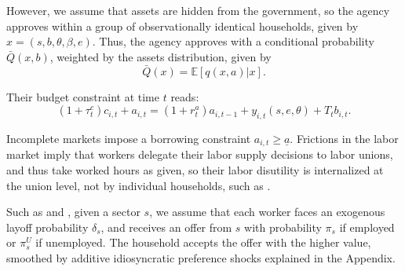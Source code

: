 \documentclass[12pt]{article}
\newcommand{\E}{\mathbb{E}}
\begin{document}
However, we assume that assets are hidden from the government, so the agency approves
within a group of observationally identical households, given by
$x = (s,b,\theta,\beta, e)$. Thus, the agency approves with a conditional probability
$\bar Q(x,b)$, weighted by the assets distribution, given by
\[
\bar Q(x) = \E\left[ q(x,a) | x \right].
\]

Their budget constraint at time $t$ reads:
\[
(1+\tau^c_t) c_{i,t} + a_{i,t} = (1+r_t^a) a_{i,t-1} + y_{i,t}(s,e,\theta) + T_t b_{i,t}.
\]

Incomplete markets impose a borrowing constraint $a_{i,t} \geq \underline{a}$. Frictions
in the labor market imply that workers delegate their labor supply decisions to labor
unions, and thus take worked hours as given, so their labor disutility is internalized
at the union level, not by individual households, such as \textcite{motta2025monetary}.

Such as \textcite{esteban2021labor} and \textcite{finamor2025labor}, given a sector $s$,
we assume that each worker faces an exogenous layoff probability $\delta_s$, and
receives an offer from $s$ with probability $\pi_s$ if employed or $\pi_s^U$ if
unemployed. The household accepts the offer with the higher value, smoothed by additive
idiosyncratic preference shocks explained in the Appendix.
\end{document}
